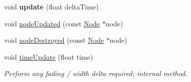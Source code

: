 \begin{DoxyCompactItemize}
\mbox{\label{classPURibbonTrail_a67e9519e2613d8aaf1b4dd92f26f49be}} 
void {\bfseries update} (float delta\+Time)
\item 
void \hyperlink{classPURibbonTrail_a67db1906af616c173f790428bd98f318}{node\+Updated} (const \hyperlink{classNode}{Node} $\ast$node)
\item 
void \hyperlink{classPURibbonTrail_a2330a097fe804b197556eff5bce345ec}{node\+Destroyed} (const \hyperlink{classNode}{Node} $\ast$node)
\item 
\mbox{\label{classPURibbonTrail_abf38ce5e5b57c0b3cf947439e78d500c}} 
void \hyperlink{classPURibbonTrail_abf38ce5e5b57c0b3cf947439e78d500c}{time\+Update} (float time)
\begin{DoxyCompactList}\small\item\em Perform any fading / width delta required; internal method. \end{DoxyCompactList}\end{DoxyCompactItemize}
